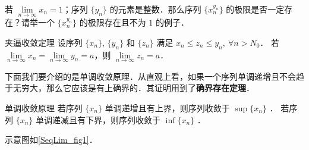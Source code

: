\begin{exercise}{}
  若 $\lim\limits_{n\rightarrow \infty} x_n=1$；序列 $\{y_n\}$ 的元素是整数．那么序列 $\{x_n^{y_n}\}$  的极限是否一定存在？请举一个 $\{x_n^{y_n}\}$ 的极限存在且不为 $1$ 的例子．
\end{exercise}

\begin{theorem}{夹逼收敛定理}
  设序列 $\{x_n\}$, $\{y_n\}$ 和 $\{z_n\}$ 满足 $x_n\leq z_n\leq y_n,\ \forall n>N_0$．
若 $\lim\limits_{n\rightarrow \infty}x_n=\lim\limits_{n\rightarrow \infty}y_n=a$，则 $\lim\limits_{n\rightarrow \infty}z_n=a$．
\end{theorem}
下面我们要介绍的是单调收敛原理．从直观上看，如果一个序列单调递增且不会趋于无穷大，那么它应该是有上确界的．其证明用到了\textbf{确界存在定理}．

\begin{theorem}{单调收敛原理}
若序列 $\{x_n\}$ 单调递增且有上界，则序列收敛于 $\sup \{x_n\}$ ．
若序列 $\{x_n\}$ 单调递减且有下界，则序列收敛于 $\inf\{x_n\}$ ．
\end{theorem}
示意图如\autoref{SeqLim_fig1}．
